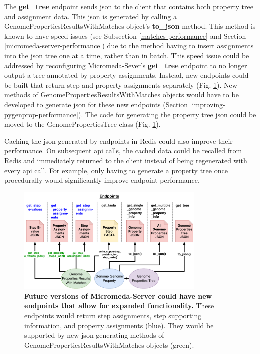 The \textbf{get\_tree} endpoint sends \gls{json} to the client that contains both property tree and assignment data. This \gls{json} is generated by calling a GenomePropertiesResultsWithMatches object's \textbf{to\_json} method. This method is known to have speed issues (see Subsection \ref{matches-performance} and Section \ref{micromeda-server-performance}) due to the method having to insert assignments into the \gls{json} tree one at a time, rather than in batch. This speed issue could be addressed by reconfiguring Micromeda-Sever's \textbf{get\_tree} endpoint to no longer output a tree annotated by property assignments. Instead, new endpoints could be built that return step and property assignments separately (Fig. \ref{fig:new_endpoints}). New methods of GenomePropertiesResultsWithMatches objects would have to be developed to generate \gls{json} for these new endpoints (Section \ref{improving-pygenprop-performance}). The code for generating the property tree \gls{json} could be moved to the GenomePropertiesTree class (Fig. \ref{fig:new_endpoints}).

Caching the \gls{json} generated by endpoints in Redis could also improve their performance. On subsequent \gls{api} calls, the cached data could be recalled from Redis and immediately returned to the client instead of being regenerated with every \gls{api} call. For example, only having to generate a property tree once procedurally would significantly improve endpoint performance.

\begin{figure}[!ht]
  \centering
	\includegraphics[width=0.8\textwidth]{media/micromeda-server-new-endpoints.pdf}
	 \caption[Future versions of Micromeda-Server could have new endpoints that allow for expanded functionality.]{\textbf{Future versions of Micromeda-Server could have new endpoints that allow for expanded functionality.} These endpoints would return step assignments, step supporting information, and property assignments (blue). They would be supported by new \gls{json} generating methods of GenomePropertiesResultsWithMatches objects (green).}
	 \label{fig:new_endpoints}
\end{figure}

